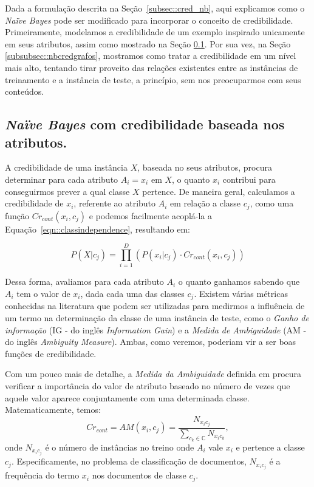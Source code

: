 Dada a formulação descrita na Seção~\ref{subsec::cred_nb}, aqui explicamos como o \textit{Naïve Bayes} pode ser modificado para incorporar o conceito de credibilidade. Primeiramente, modelamos a credibilidade de um exemplo inspirado unicamente em seus atributos, assim como mostrado na Seção \ref{subsubsec::nbcredconteudo}. Por sua vez, na Seção \ref{subsubsec::nbcredgrafos}, mostramos como tratar a credibilidade em um nível mais alto, tentando tirar proveito das relações existentes entre as instâncias de treinamento e a instância de teste, a princípio, sem nos preocuparmos com seus conteúdos.

\subsection{\textit{Naïve Bayes} com credibilidade baseada nos atributos.}
\label{subsubsec::nbcredconteudo}

A credibilidade de uma instância $X$, baseada no seus atributos, procura determinar para cada atributo $A_i = x_i$ em $X$, o quanto $x_i$ contribui para conseguirmos prever a qual classe $X$ pertence. De maneira geral, calculamos a credibilidade de $x_i$, referente ao atributo $A_i$ em relação a classe $c_j$, como uma função $Cr_{cont}(x_i, c_j)$ e podemos facilmente acoplá-la a Equação~\ref{eqn::classindependence}, resultando em:

\begin{equation}\label{eqn::classindependence_conteudo}
   P(X|c_{j}) = \prod^{D}_{i=1}{(P(x_i|c_j) \cdot Cr_{cont}(x_i,c_j))} 
\end{equation}

Dessa forma, avaliamos para cada atributo $A_i$ o quanto ganhamos sabendo que $A_i$ tem o valor de $x_i$, dada cada uma das classes $c_j$. Existem várias métricas conhecidas na literatura que podem ser utilizadas para medirmos a influência de um termo na determinação da classe de uma instância de teste, como o \textit{Ganho de informação} (\textsc{IG} - do inglês \textit{Information Gain}) e a \textit{Medida de Ambiguidade} (\textsc{AM} - do inglês \textit{Ambiguity Measure}). Ambas, como veremos, poderiam vir a ser boas funções de credibilidade. 


    Com um pouco mais de detalhe, a \textit{Medida da Ambiguidade} definida em \cite{Mengle08} procura verificar a importância do valor de atributo baseado no número de vezes que aquele valor aparece conjuntamente com uma determinada classe. Matematicamente, temos:
\begin{equation}\label{eqn::classindependence_conteudo_am}
   Cr_{cont} = AM(x_i, c_j) = \frac{ N_{x_{i}c_{j}}}{\sum_{c_k \in \mathbb{C}} N_{x_{i}c_{k}}},
\end{equation}
   onde $N_{x_{i}c_{j}}$ é o número de instâncias no treino onde $A_i$ vale $x_i$ e pertence a classe $c_j$. Especificamente, no problema de classificação de documentos, $N_{x_{i}c_{j}}$ é a frequência do termo $x_i$ nos documentos de classe $c_j$.

